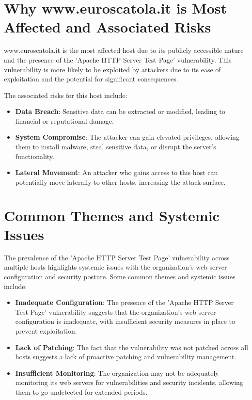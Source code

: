\section{Why www.euroscatola.it is Most Affected and Associated Risks}

www.euroscatola.it is the most affected host due to its publicly accessible nature and the presence of the 'Apache HTTP Server Test Page' vulnerability. This vulnerability is more likely to be exploited by attackers due to its ease of exploitation and the potential for significant consequences.

The associated risks for this host include:
\begin{itemize}
\item \textbf{Data Breach}: Sensitive data can be extracted or modified, leading to financial or reputational damage.
\item \textbf{System Compromise}: The attacker can gain elevated privileges, allowing them to install malware, steal sensitive data, or disrupt the server's functionality.
\item \textbf{Lateral Movement}: An attacker who gains access to this host can potentially move laterally to other hosts, increasing the attack surface.
\end{itemize}
\section{Common Themes and Systemic Issues}

The prevalence of the 'Apache HTTP Server Test Page' vulnerability across multiple hosts highlights systemic issues with the organization's web server configuration and security posture. Some common themes and systemic issues include:
\begin{itemize}
\item \textbf{Inadequate Configuration}: The presence of the 'Apache HTTP Server Test Page' vulnerability suggests that the organization's web server configuration is inadequate, with insufficient security measures in place to prevent exploitation.
\item \textbf{Lack of Patching}: The fact that the vulnerability was not patched across all hosts suggests a lack of proactive patching and vulnerability management.
\item \textbf{Insufficient Monitoring}: The organization may not be adequately monitoring its web servers for vulnerabilities and security incidents, allowing them to go undetected for extended periods.
\end{itemize}


